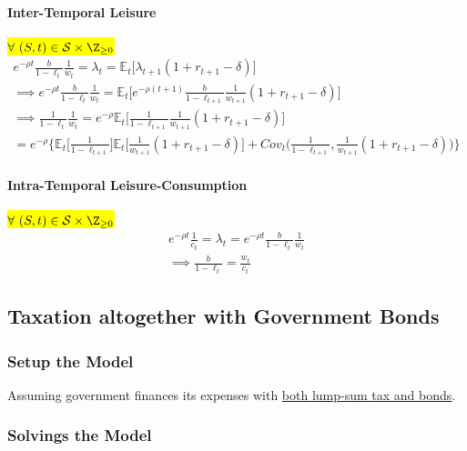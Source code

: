 \documentclass[11pt]{article}
\newcommand{\expat}[2]{\mathbb{E}_{#1}\Big[{#2}\Big]}
\begin{document}
				\paragraph{Inter-Temporal Leisure} \hl{$\forall \ (S, t) \in \mc{S} \times \Z_{\geq 0}$}
				\begin{gather}
					e^{-\rho t} \frac{b}{1-\ell_t} \frac{1}{w_t} = \lambda_t = \expat{t}{\lambda_{t+1} (1+r_{t+1}-\delta)} \\
					\implies e^{-\rho t} \frac{b}{1-\ell_t} \frac{1}{w_t} = \expat{t}{e^{-\rho(t+1)} \frac{b}{1-\ell_{t+1}} \frac{1}{w_{t+1}} (1+r_{t+1}-\delta)} \\
					\implies \frac{1}{1-\ell_t}\frac{1}{w_t} = e^{-\rho} \expat{t}{\frac{1}{1-\ell_{t+1}} \frac{1}{w_{t+1}} (1 + r_{t+1} - \delta)} \\
					= e^{-\rho}\Big \{
						\expat{t}{\frac{1}{1 - \ell_{t+1}}} \expat{t}{\frac{1}{w_{t+1}} (1 + r_{t+1} - \delta)} + Cov_t \Big(
								\frac{1}{1-\ell_{t+1}}, \frac{1}{w_{t+1}} (1 + r_{t+1} - \delta)
							\Big)
					\Big \}
				\end{gather}
				
				\paragraph{Intra-Temporal Leisure-Consumption} \hl{$\forall \ (S, t) \in \mc{S} \times \Z_{\geq 0}$}
					\begin{gather}
						e^{-\rho t} \frac{1}{c_t} = \lambda_t =  e^{-\rho t} \frac{b}{1 - \ell_t} \frac{1}{w_t} \\
						\implies \frac{b}{1-\ell_t} = \frac{w_t}{c_t}
					\end{gather}
					
		\setcounter{equation}{0}
		\subsection{Taxation altogether with  Government Bonds}
			\subsubsection{Setup the Model}
			\begin{assumption}
				Assuming government finances its expenses with \ul{both lump-sum tax and bonds}.
			\end{assumption}
			
			\subsubsection{Solvings the Model}
\end{document}
